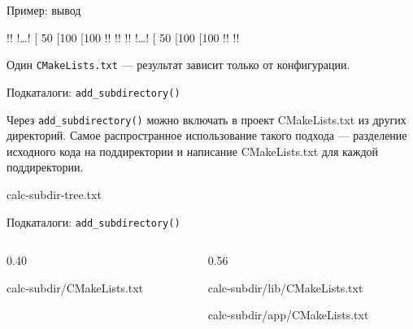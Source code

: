 \documentclass[compress, 8pt, aspectratio=169]{beamer}
\begin{document}
\begin{frame}[fragile]{Пример: вывод}

  \begin{terminalwindow}
!!
!\dots!
[ 50%
[100%
[100%
!!
!!
!!
!\dots!
[ 50%
[100%
[100%
!!
!!
  \end{terminalwindow}

  \bigbreak

  Один \texttt{CMakeLists.txt} --- результат зависит только от
  конфигурации.

\end{frame}

\begin{frame}[fragile]{Подкаталоги: \texttt{add\_subdirectory()}}

  Через \texttt{add\_subdirectory()} можно включать в проект CMakeLists.txt
  из других директорий.
  Самое распространное использование такого подхода --- разделение исходного
  кода на поддиректории и написание CMakeLists.txt для каждой поддиректории.

  \bigbreak

    {calc-subdir-tree.txt}

\end{frame}

\begin{frame}[fragile]{Подкаталоги: \texttt{add\_subdirectory()}}

  \begin{columns}[T]

    \begin{column}{0.40\textwidth}

        {calc-subdir/CMakeLists.txt}

    \end{column}

    \begin{column}{0.56\textwidth}

        {calc-subdir/lib/CMakeLists.txt}

        {calc-subdir/app/CMakeLists.txt}

    \end{column}

  \end{columns}

\end{frame}
\end{document}
